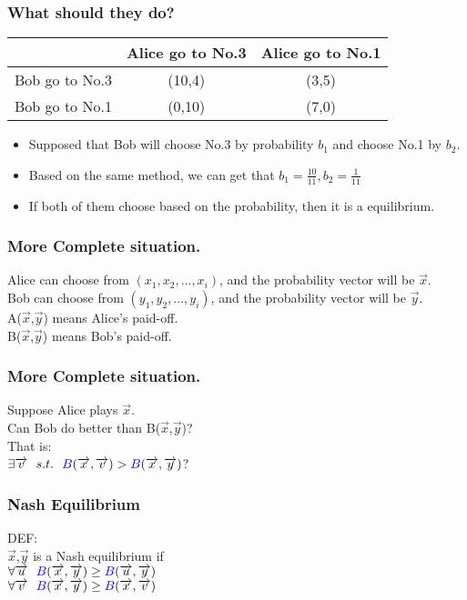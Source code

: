 \documentclass{beamer}
\begin{document}
\begin{frame}
\frametitle{What should they do?}
\begin{tabular}{|c|c|c|}
\hline
\hline
    & {\color{red}Alice} go to No.3 & {\color{red}Alice} go to No.1\\
\hline
{\color{blue}Bob} go to No.3 & ({\color{blue}10},{\color{red}4}) & ({\color{blue}3},{\color{red}5})\\
\hline
{\color{blue}Bob} go to No.1 & ({\color{blue}0},{\color{red}10}) & ({\color{blue}7},{\color{red}0})\\
\hline
\hline
\end{tabular}
\begin{itemize}
\item Supposed that Bob will choose No.3 by probability $b_1$ and choose No.1 by $b_2$.
\item Based on the same method, we can get that $b_1 = \frac{10}{11},b_2 = \frac{1}{11}$
\item If both of them choose based on the probability, then it is a equilibrium.
\end{itemize}
\end{frame}

\begin{frame}
\frametitle{More Complete situation.}
{\color{red}Alice} can choose from $(x_1,x_2,...,x_i)$, and the probability vector will be $\overrightarrow{x}$.\\
{\color{blue}Bob} can choose from $(y_1,y_2,...,y_i)$, and the probability vector will be $\overrightarrow{y}$.\\
{\color{red}A}($\overrightarrow{x}$,$\overrightarrow{y}$) means {\color{red}Alice}'s paid-off.\\
{\color{blue}B}($\overrightarrow{x}$,$\overrightarrow{y}$) means {\color{blue}Bob}'s paid-off.\\
\end{frame}

\begin{frame}
\frametitle{More Complete situation.}
Suppose {\color{red}Alice} plays $\overrightarrow{x}$.\\
Can {\color{blue}Bob} do better than {\color{blue}B}($\overrightarrow{x}$,$\overrightarrow{y}$)?\\
That is:\\
        \qquad $\exists \overrightarrow{v} ~~s.t. ~~{\color{blue}B}(\overrightarrow{x},\overrightarrow{v}) >{\color{blue}B}(\overrightarrow{x},\overrightarrow{y})$?
\end{frame}

\begin{frame}
\frametitle{Nash Equilibrium}
DEF:\\
\qquad $\overrightarrow{x}$,$\overrightarrow{y}$ is a Nash equilibrium if\\
\qquad $\forall \overrightarrow{u} ~~{\color{blue}B}(\overrightarrow{x},\overrightarrow{y}) \geq{\color{blue}B}(\overrightarrow{u},\overrightarrow{y})$\\
\qquad $\forall \overrightarrow{v} ~~{\color{blue}B}(\overrightarrow{x},\overrightarrow{y}) \geq{\color{blue}B}(\overrightarrow{x},\overrightarrow{v})$
\end{frame}
\end{document}
